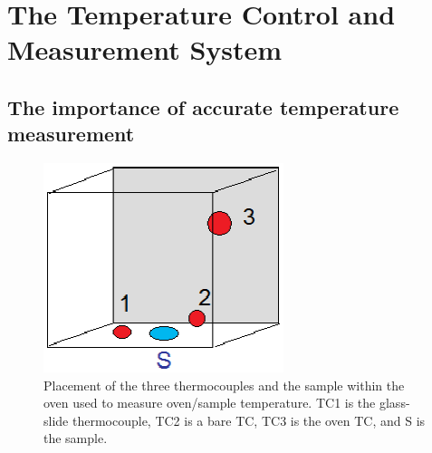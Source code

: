 \documentclass[12pt,oneside,english]{article}
\begin{document}
	

	\clearpage
	\section{The Temperature Control and Measurement System}
	\subsection{The importance of accurate temperature measurement}
	
	
	\begin{figure}
		\includegraphics[width=70mm]{images/oven_tc_placement.eps}
		\caption{Placement of the three thermocouples and the sample within the oven used to measure oven/sample temperature.  TC1 is the glass-slide thermocouple, TC2 is a bare TC, TC3 is the oven TC, and S is the sample.}
		\label{f:oven_tc}
	\end{figure}
	
\end{document}
